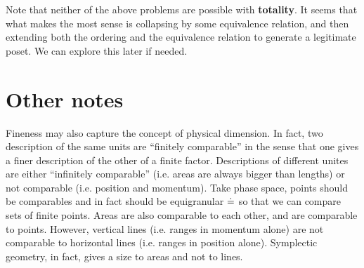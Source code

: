 \documentclass{article}
\begin{document}
Note that neither of the above problems are possible with {\bf totality}. It seems that what makes the most sense is collapsing by some equivalence relation, and then extending both the ordering and the equivalence relation to generate a legitimate poset. We can explore this later if needed. 



\section{Other notes}

Fineness may also capture the concept of physical dimension. In fact, two description of the same units are ``finitely comparable'' in the sense that one gives a finer description of the other of a finite factor. Descriptions of different unites are either ``infinitely comparable'' (i.e. areas are always bigger than lengths) or not comparable (i.e. position and momentum). Take phase space, points should be comparables and in fact should be equigranular $\doteq$ so that we can compare sets of finite points. Areas are also comparable to each other, and are comparable to points. However, vertical lines (i.e. ranges in momentum alone) are not comparable to horizontal lines (i.e. ranges in position alone). Symplectic geometry, in fact, gives a size to areas and not to lines.




\end{document}

